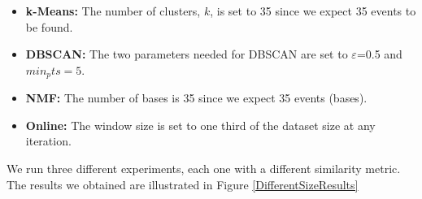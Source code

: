 \begin{itemize}
  \item \textbf{k-Means:} The number of clusters, $k$, is set to 35 since we expect 35 events to be found. 
  \item \textbf{DBSCAN:} The two parameters needed for DBSCAN are set to $ε$=0.5 and $min_pts=5$. 
  \item \textbf{NMF:} The number of bases is 35 since we expect 35 events (bases).
  \item \textbf{Online:} The window size is set to one third of the dataset size at any iteration. 
\end{itemize}\vspace{15pt}
We run three different experiments, each one with a different similarity metric. The results we obtained are illustrated in Figure \ref{DifferentSizeResults}

